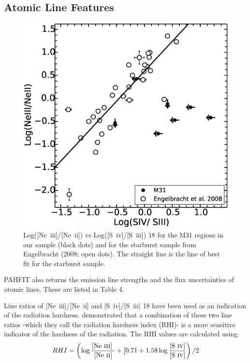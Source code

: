 \subsection{Atomic Line Features}
\begin{figure}

\centering
\includegraphics[scale=0.3]{./NevsS.eps}
\caption{ Log([Ne~{\sc iii}]/[Ne~{\sc ii}])  vs Log([S~{\sc iv}]/[S~{\sc iii}]) 18 for the M31 regions in our sample (black dots) and for the starburst sample from Engelbracht (2008; open dots). The straight line is the line of best fit for the starburst sample.}
\label{SvsNe}
\end{figure}

PAHFIT also returns the emission line strengths and the flux uncertainties of atomic lines. These are listed in Table 4.

	Line ratios of [Ne~{\sc iii}]/[Ne~{\sc ii}] and [S~{\sc iv}]/[S~{\sc iii}] 18 have been used as an indication of the radiation hardness. \citet{Engelbracht_2008} demonstrated that a combination of these two line ratios -which they call the radiation hardness index (RHI)- is a more sensitive indicator of the hardness of the radiation. The RHI values are calculated using
\vspace{5 mm}	
\begin{equation}
{RHI = \left( \log\frac{\textrm{[Ne~{\sc iii}] }}{\textrm{[Ne~{\sc ii}]}} + [0.71 + 1.58\log\frac{\textrm{{[S~{\sc iv}]}}}{\textrm{{[S~{\sc iv}]}}}\right) /2}
\vspace{5 mm}	
\end{equation}

